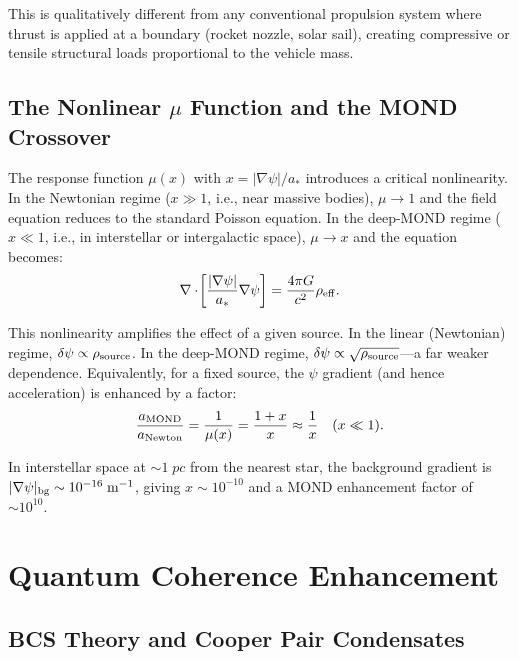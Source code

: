 \documentclass[twocolumn,prl,superscriptaddress,nofootinbib,longbibliography,floatfix]{revtex4-2}
\newcommand{\astar}{a_*}
\begin{document}
This is qualitatively different from any conventional propulsion system
where thrust is applied at a boundary (rocket nozzle, solar sail), creating
compressive or tensile structural loads proportional to the vehicle mass.

\subsection{The Nonlinear $\mu$ Function and the MOND Crossover}

The response function $\mu(x)$ with $x = |\nabla\psi|/\astar$ introduces a
critical nonlinearity.  In the Newtonian regime ($x \gg 1$, i.e., near
massive bodies), $\mu \to 1$ and the field equation reduces to the
standard Poisson equation.  In the deep-MOND regime ($x \ll 1$, i.e., in
interstellar or intergalactic space), $\mu \to x$ and the equation
becomes:
\begin{equation}
\nabla\cdot\!\left[\frac{|\nabla\psi|}{\astar}\nabla\psi\right]
= \frac{4\pi G}{c^2}\rho_{\rm eff}.
\label{eq:deep-mond}
\end{equation}

This nonlinearity amplifies the effect of a given source.  In the
linear (Newtonian) regime, $\delta\psi \propto \rho_{\rm source}$.  In
the deep-MOND regime, $\delta\psi \propto \sqrt{\rho_{\rm source}}$---a
far weaker dependence.  Equivalently, for a fixed source, the
$\psi$ gradient (and hence acceleration) is enhanced by a factor:
\begin{equation}
\frac{a_{\rm MOND}}{a_{\rm Newton}} = \frac{1}{\mu(x)}
= \frac{1+x}{x} \approx \frac{1}{x} \quad (x \ll 1).
\label{eq:mond-enhancement}
\end{equation}

In interstellar space at $\sim 1\;\si{pc}$ from the nearest star, the
background gradient is
$|\nabla\psi|_{\rm bg} \sim 10^{-16}\;\si{m^{-1}}$, giving
$x \sim 10^{-10}$ and a MOND enhancement factor of $\sim 10^{10}$.

\section{Quantum Coherence Enhancement}\label{sec:quantum}

\subsection{BCS Theory and Cooper Pair Condensates}
\end{document}
